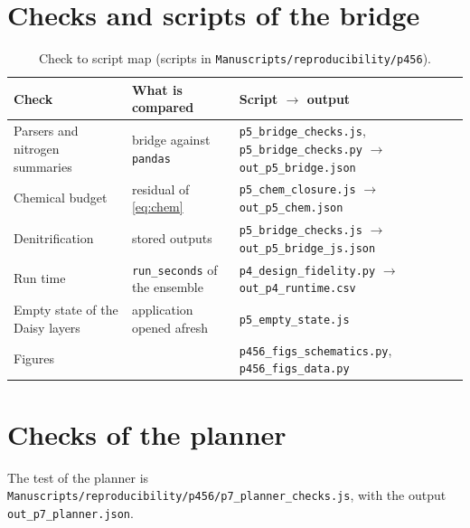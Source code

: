 \section{Checks and scripts of the bridge}\label{app:repro5}
\begin{table}[H]\centering\small
\caption{Check to script map (scripts in \texttt{Manuscripts/reproducibility/p456}).}
\begin{tabularx}{\textwidth}{>{\raggedright\arraybackslash}p{4.6cm}>{\raggedright\arraybackslash}p{4.0cm}X}
\toprule Check & What is compared & Script $\to$ output\\\midrule
Parsers and nitrogen summaries & bridge against \texttt{pandas} & \texttt{p5\_bridge\_checks.js}, \texttt{p5\_bridge\_checks.py} $\to$ \texttt{out\_p5\_bridge.json}\\
Chemical budget & residual of \cref{eq:chem} & \texttt{p5\_chem\_closure.js} $\to$ \texttt{out\_p5\_chem.json}\\
Denitrification & 792 stored outputs & \texttt{p5\_bridge\_checks.js} $\to$ \texttt{out\_p5\_bridge\_js.json}\\
Run time & \texttt{run\_seconds} of the ensemble & \texttt{p4\_design\_fidelity.py} $\to$ \texttt{out\_p4\_runtime.csv}\\
Empty state of the Daisy layers & application opened afresh & \texttt{p5\_empty\_state.js}\\
Figures & & \texttt{p456\_figs\_schematics.py}, \texttt{p456\_figs\_data.py}\\\bottomrule
\end{tabularx}
\end{table}

\section{Checks of the planner}\label{app:repro7}
The test of the planner is \texttt{Manuscripts/reproducibility/p456/p7\_planner\_checks.js}, with the output \texttt{out\_p7\_planner.json}.




